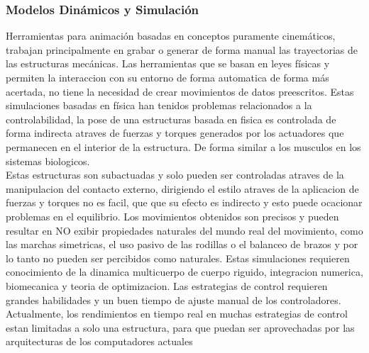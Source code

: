 \documentclass[10pt,onecolumn,twoside,letterpaper]{article}
\begin{document}
\subsubsection{Modelos Din\'amicos y Simulaci\'on}
Herramientas para animaci\'on basadas en conceptos puramente cinem\'aticos, trabajan principalmente en grabar o generar de forma manual las trayectorias de las estructuras mec\'anicas. Las herramientas que se basan en leyes f\'isicas y permiten la interaccion con su entorno de forma automatica de forma m\'as acertada, no tiene la necesidad de crear movimientos de datos preescritos. Estas simulaciones basadas en f\'isica han tenidos problemas relacionados a la controlabilidad, la pose de una estructuras basada en fisica es controlada de forma indirecta atraves de fuerzas y torques generados por los actuadores que permanecen en el interior de la estructura. De forma similar a los musculos en los sistemas biologicos. \\
Estas estructuras son subactuadas y solo pueden ser controladas atraves de la manipulacion del contacto externo, dirigiendo el estilo atraves de la aplicacion de fuerzas y torques no es facil, que que su efecto es indirecto y esto puede ocacionar problemas en el equilibrio. Los movimientos obtenidos son precisos y pueden resultar en NO exibir propiedades naturales del mundo real del movimiento, como las marchas simetricas, el uso pasivo de las rodillas o el balanceo de brazos y por lo tanto no pueden ser percibidos como naturales. Estas simulaciones requieren conocimiento de la dinamica multicuerpo de cuerpo riguido, integracion numerica, biomecanica y teoria de optimizacion. Las estrategias de control requieren grandes habilidades y un buen tiempo de ajuste manual de los controladores. Actualmente, los rendimientos en tiempo real en muchas estrategias de control estan limitadas a solo una estructura, para que puedan ser aprovechadas por las arquitecturas de los computadores actuales\cite{Geijtenbeek2012}\\
\end{document}
